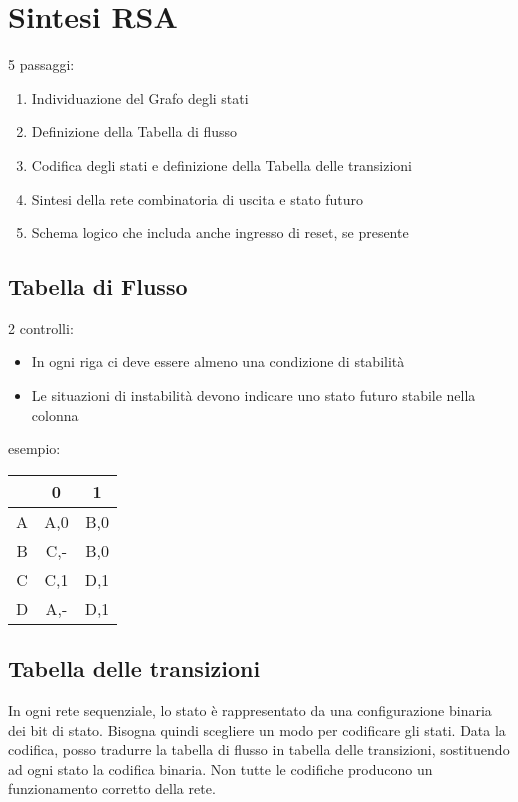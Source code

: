 \documentclass{subfiles}
\begin{document}
\section{Sintesi RSA}

5 passaggi:

\begin{enumerate}
    \item Individuazione del Grafo degli stati
    \item Definizione della Tabella di flusso
    \item Codifica degli stati e definizione della Tabella delle transizioni
    \item Sintesi della rete combinatoria di uscita e stato futuro
    \item Schema logico che includa anche ingresso di reset, se presente
\end{enumerate}

\subsection{Tabella di Flusso}

2 controlli:

\begin{itemize}
    \item In ogni riga ci deve essere almeno una condizione di stabilità
    \item Le situazioni di instabilità devono indicare uno stato futuro stabile nella colonna
\end{itemize}

\noindent
esempio:

\begin{center}
\begin{tabular}{ |c|c|c| }
\hline
& 0 & 1 \\
\hline
\hline
A & A,0 & B,0 \\
B & C,- & B,0 \\
C & C,1 & D,1 \\
D & A,- & D,1 \\
\hline
\end{tabular}
\end{center}

\subsection{Tabella delle transizioni}

In ogni rete sequenziale, lo stato è rappresentato da una configurazione binaria dei bit di stato.
Bisogna quindi scegliere un modo per codificare gli stati.
Data la codifica, posso tradurre la tabella di flusso in tabella delle transizioni, sostituendo ad ogni stato la codifica binaria.
Non tutte le codifiche producono un funzionamento corretto della rete.\\
\end{document}
